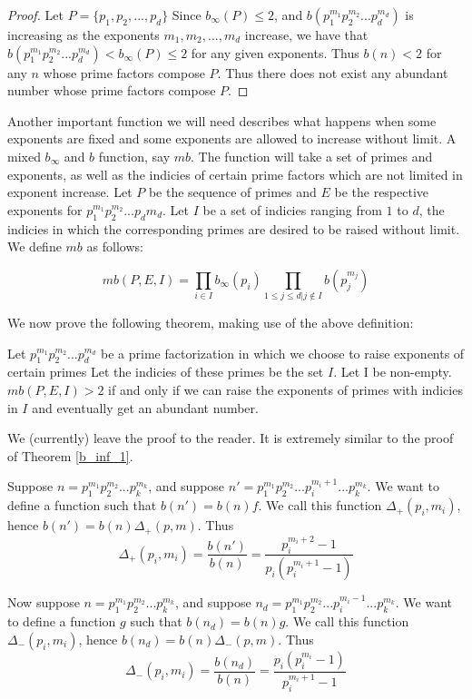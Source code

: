 \documentclass[../paper.tex]{article}
\begin{document}
\begin{proof}
Let $P = \{p_1, p_2, ..., p_d\}$
Since $b_{\infty}(P) \leq 2$, and $b(p_1^{m_1} p_2^{m_2} ... p_d^{m_d})$
is increasing as the exponents $m_1, m_2, ..., m_d$ increase, we have that
$b(p_1^{m_1} p_2^{m_2} ... p_d^{m_d}) < b_{\infty}(P) \leq 2$ for any 
given exponents. Thus $b(n) < 2$ for any $n$ whose prime factors
compose $P$. Thus there does not exist any abundant number whose 
prime factors compose $P$.

\end{proof}

Another important function we will need describes what happens 
when some exponents are fixed and some exponents are allowed to
increase without limit. A mixed $b_{\infty}$ and $b$ function, 
say $mb$. The function will take a set of primes and exponents,
as well as the indicies of certain prime factors which are not
limited in exponent increase. Let $P$ be the sequence of primes 
and $E$ be the respective exponents for 
$p_1^{m_1} p_2^{m_2} ... p_d{m_d}$. Let $I$ be a set of indicies
ranging from $1$ to $d$, the indicies in which the corresponding
primes are desired to be raised without limit. We define $mb$ as 
follows:

\begin{equation}\label{mb_def}
  mb(P,E,I) = \prod_{i \in I} b_{\infty}(p_i) 
  \prod_{1 \leq j \leq d | j \notin I} b(p_j^{m_j})
\end{equation}

We now prove the following theorem, making use of the above definition:

\begin{theorem}
Let $p_1^{m_1} p_2^{m_2} ... p_d^{m_d}$ be a prime factorization 
in which we choose to raise exponents of certain primes Let the 
indicies of these primes be the set $I$. Let I be non-empty.
$mb(P,E,I) > 2$ if and only if we can raise the exponents of primes with 
indicies in $I$ and eventually get an abundant number.
\end{theorem}

We (currently) leave the proof to the reader. It is extremely 
similar to the proof of Theorem {\ref{b_inf_1}}.

Suppose $n=p_1^{m_1}p_2^{m_2}...p_{k}^{m_k}$, and suppose 
$n'=p_1^{m_1}p_2^{m_2}...p_i^{m_i + 1}...p_{k}^{m_k}$. We want
to define a function such that $b(n') = b(n) f$. We call this
function $\Delta_{+}(p_i, m_i)$, hence $b(n') = b(n) \Delta_{+}(p,m)$.
Thus 
%
$$\Delta_{+}(p_i, m_i) = \frac{b(n')}{b(n)} = 
\frac{p_i^{m_i+2} - 1}{ p_i (p_i^{m_i + 1} - 1)}$$
%

	Now suppose $n=p_1^{m_1}p_2^{m_2}...p_{k}^{m_k}$, and suppose 
$n_d=p_1^{m_1}p_2^{m_2}...p_i^{m_i - 1}...p_{k}^{m_k}$. We want
to define a function $g$ such that $b(n_d) = b(n) g$. We call this
function $\Delta_{-}(p_i, m_i)$, hence $b(n_d) = b(n) \Delta_{-}(p,m)$.
Thus 
%
$$\Delta_{-}(p_i, m_i) = \frac{b(n_d)}{b(n)} = 
\frac{p_i(p_i^{m_i} - 1)}{ p_i^{m_i + 1} - 1}$$
%
\end{document}
